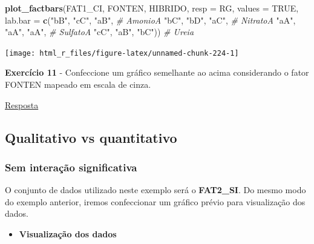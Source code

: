 \documentclass[
]{book}
\newenvironment{Shaded}{\begin{snugshade}}{\end{snugshade}}
\newcommand{\CommentTok}[1]{\textcolor[rgb]{0.56,0.35,0.01}{\textit{#1}}}
\newcommand{\DataTypeTok}[1]{\textcolor[rgb]{0.13,0.29,0.53}{#1}}
\newcommand{\KeywordTok}[1]{\textcolor[rgb]{0.13,0.29,0.53}{\textbf{#1}}}
\newcommand{\NormalTok}[1]{#1}
\newcommand{\OtherTok}[1]{\textcolor[rgb]{0.56,0.35,0.01}{#1}}
\newcommand{\StringTok}[1]{\textcolor[rgb]{0.31,0.60,0.02}{#1}}
\providecommand{\tightlist}{%
  \setlength{\itemsep}{0pt}\setlength{\parskip}{0pt}}
\begin{document}
\begin{Shaded}
\begin{Highlighting}[]

\KeywordTok{plot_factbars}\NormalTok{(FAT1_CI, FONTEN, HIBRIDO, }\DataTypeTok{resp =}\NormalTok{ RG,}
              \DataTypeTok{values =} \OtherTok{TRUE}\NormalTok{,}
              \DataTypeTok{lab.bar =} \KeywordTok{c}\NormalTok{(}\StringTok{"bB"}\NormalTok{, }\StringTok{"cC"}\NormalTok{, }\StringTok{"aB"}\NormalTok{, }\CommentTok{# AmonioA}
                          \StringTok{"bC"}\NormalTok{, }\StringTok{"bD"}\NormalTok{, }\StringTok{"aC"}\NormalTok{, }\CommentTok{# NitratoA}
                          \StringTok{"aA"}\NormalTok{, }\StringTok{"aA"}\NormalTok{, }\StringTok{"aA"}\NormalTok{, }\CommentTok{# SulfatoA}
                          \StringTok{"cC"}\NormalTok{, }\StringTok{"aB"}\NormalTok{, }\StringTok{"bC"}\NormalTok{)) }\CommentTok{# Ureia}
\end{Highlighting}
\end{Shaded}

\begin{center}\texttt{[image: html\_r\_files/figure-latex/unnamed-chunk-224-1]} \end{center}

\begin{tarefa}
\textbf{Exercício 11}
- Confeccione um gráfico semelhante ao acima considerando o fator FONTEN mapeado em escala de cinza.
\end{tarefa}

\protect\hyperlink{exerc11}{Resposta}

\hypertarget{qualitativo-vs-quantitativo}{%
\subsection{Qualitativo vs quantitativo}\label{qualitativo-vs-quantitativo}}

\hypertarget{sem-interauxe7uxe3o-significativa-1}{%
\subsubsection{Sem interação significativa}\label{sem-interauxe7uxe3o-significativa-1}}

O conjunto de dados utilizado neste exemplo será o \textbf{FAT2\_SI}. Do mesmo modo do exemplo anterior, iremos confeccionar um gráfico prévio para visualização dos dados.

\begin{itemize}
\tightlist
\item
  \textbf{Visualização dos dados}
\end{itemize}
\end{document}
